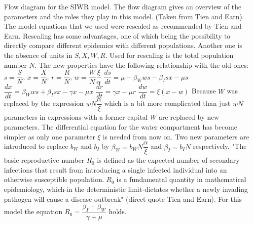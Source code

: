 \documentclass[11pt]{article}
\begin{document}
\linebreak
Flow diagram for the SIWR model. The flow diagram gives an overview of the parameters and the roles they play in this model. (Taken from Tien and Earn).
The model equations that we used were rescaled as recommended by Tien and Earn. Rescaling has some advantages, one of which being the possibility to directly compare different epidemics with different populations. Another one is the absence of units in $ S, X, W, R $. Used for rescaling is the total population number $ N $. The new properties have the following relationship with the old ones: \linebreak
$ s=\dfrac{S}{N} $,	$ x=\dfrac{X}{N} $,	$ r=\dfrac{R}{N} $,	$ w=\dfrac{W}{N}\dfrac{\xi}{\alpha} $
\linebreak
$ \dfrac{ds}{dt}=\mu -\beta_{W}ws-\beta_{I}sx-\mu s $
\linebreak
$ \dfrac{dx}{dt}=\beta_{W}ws+\beta_{I}sx-\gamma x-\mu x $
\linebreak
$ \dfrac{dr}{dt}=\gamma x-\mu r $
\linebreak
$ \dfrac{dw}{dt}=\xi (x-w) $
\linebreak
Because $ W $ was replaced by the expression $ wN\dfrac{\alpha}{\xi} $ which is a bit more complicated than just $ wN $ parameters in expressions with a former capital $ W $ are replaced by new parameters. The differential equation for the water compartment has become simpler as only one parameter $ \xi $ is needed from now on. Two new parameters are introduced to replace $ b_{W} $ and $ b_{I} $ by $ \beta_{W}=b_{W}N\dfrac{\alpha}{\xi} $ and $ \beta_{I}=b_{I}N $ respectively.
"The basic reproductive number $ R_{0} $ is defined as the expected number of secondary infections that result from introducing a single infected individual into an otherwise susceptible population. $ R_{0} $ is a fundamental quantity in mathematical epidemiology, which-in the deterministic limit-dictates whether a newly invading pathogen will cause a disease outbreak" (direct quote Tien and Earn). For this model the equation $ R_{0}=\dfrac{\beta_{I}+\beta_{W}}{\gamma+\mu} $ holds.
\end{document}
